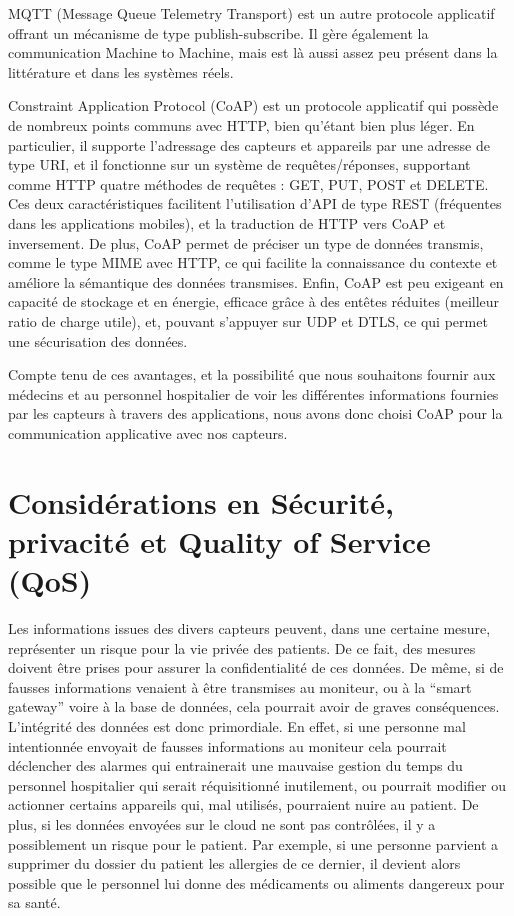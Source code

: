 \documentclass{article}
\begin{document}
MQTT (Message Queue Telemetry Transport) \cite{MQTT} est un autre protocole applicatif offrant un mécanisme de type publish-subscribe. Il gère également la communication Machine to Machine, mais est là aussi assez peu présent dans la littérature et dans les systèmes réels.

Constraint Application Protocol (CoAP) \cite{CoAP} est un protocole applicatif qui possède de nombreux points communs avec HTTP, bien qu’étant bien plus léger. En particulier, il supporte l’adressage des capteurs et appareils par une adresse de type URI, et il fonctionne sur un système de requêtes/réponses, supportant comme HTTP quatre méthodes de requêtes : GET, PUT, POST et DELETE. Ces deux caractéristiques facilitent l’utilisation d’API de type REST (fréquentes dans les applications mobiles), et la traduction de HTTP vers CoAP et inversement. De plus, CoAP permet de préciser un type de données transmis, comme le type MIME avec HTTP, ce qui facilite la connaissance du contexte et améliore la sémantique des données transmises. Enfin, CoAP est peu exigeant en capacité de stockage et en énergie, efficace grâce à des entêtes réduites (meilleur ratio de charge utile), et, pouvant s’appuyer sur UDP et DTLS, ce qui permet une sécurisation des données.

Compte tenu de ces avantages, et la possibilité que nous souhaitons fournir aux médecins et au personnel hospitalier de voir les différentes informations fournies par les capteurs à travers des applications, nous avons donc choisi CoAP pour la communication applicative avec nos capteurs.

\section {Considérations en Sécurité, privacité et Quality of Service (QoS)}

Les informations issues des divers capteurs peuvent, dans une certaine mesure, représenter un risque pour la vie privée des patients. De ce fait, des mesures doivent être prises pour assurer la confidentialité de ces données. De même, si de fausses informations venaient à être transmises au moniteur, ou à la “smart gateway” voire à la base de données, cela pourrait avoir de graves conséquences. L'intégrité des données est donc primordiale. En effet, si une personne mal intentionnée envoyait de fausses informations au moniteur cela pourrait déclencher des alarmes qui entrainerait une mauvaise gestion du temps du personnel hospitalier qui serait réquisitionné inutilement, ou pourrait modifier ou actionner certains appareils qui, mal utilisés, pourraient nuire au patient. De plus, si les données envoyées sur le cloud ne sont pas contrôlées, il y a possiblement un risque pour le patient. Par exemple, si une personne parvient a supprimer du dossier du patient les allergies de ce dernier, il devient alors possible que le personnel lui donne des médicaments ou aliments dangereux pour sa santé.
\end{document}

